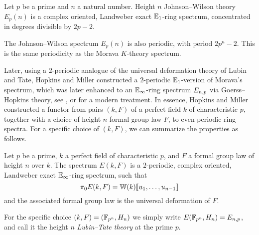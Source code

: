 \begin{proposition}
    \label{ch0:prop:Johnson-Wilson-properties}
    Let $p$ be a prime and $n$ a natural number. Height $n$ Johnson--Wilson theory $E_p(n)$ is a complex oriented, Landweber exact $\mathbb{E}_1$-ring spectrum, concentrated in degrees divisible by $2p-2$. 
\end{proposition}

\begin{remark}
    The Johnson--Wilson spectrum $E_p(n)$ is also periodic, with period $2p^n-2$. This is the same periodicity as the Morava $K$-theory spectrum. 
\end{remark}

Later, using a $2$-periodic analogue of the universal deformation theory of Lubin and Tate, Hopkins and Miller constructed a $2$-periodic $\mathbb{E}_1$-version of Morava's spectrum, which was later enhanced to an $\mathbb{E}_\infty$-ring spectrum $E_{n,p}$ via Goerss--Hopkins theory, see \cite{goerss-hopkins_04}, or \cite{pstragowski_vankoughnett_2022} for a modern treatment. In essence, Hopkins and Miller constructed a functor from pairs $(k, F)$ of a perfect field $k$ of characteristic $p$, together with a choice of height $n$ formal group law $F$, to even periodic ring spectra. For a specific choice of $(k, F)$, we can summarize the properties as follows.  

\begin{proposition}
    Let $p$ be a prime, $k$ a perfect field of characteristic $p$, and $F$ a formal group law of height $n$ over $k$. The spectrum $E(k,F)$ is a $2$-periodic, complex oriented, Landweber exact $\mathbb{E}_\infty$-ring spectrum, such that 
    \[\pi_0 E(k,F)=\mathbb{W}(k)[\![ u_1, \ldots, u_{n-1}]\!]\] 
    and the associated formal group law is the universal deformation of $F$. 
\end{proposition}




\begin{definition}
    For the specific choice $(k,F) = (\mathbb{F}_{p^n}, H_n)$ we simply write $E(\mathbb{F}_{p^n}, H_n) = E_{n,p}$, and call it the height $n$ \emph{Lubin--Tate theory} at the prime $p$. 
\end{definition}

